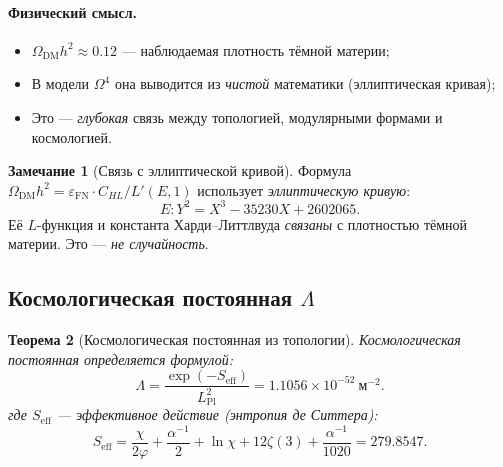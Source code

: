 \documentclass[11pt,a4paper]{article}
\newcommand{\Om}{\Omega^4}
\newcommand{\epsFN}{\varepsilon_{\text{FN}}}
\newtheorem{theorem}{Теорема}[section]
\theoremstyle{definition}
\newtheorem{remark}[theorem]{Замечание}
\begin{document}
\paragraph{Физический смысл.}
\begin{itemize}
    \item $\Omega_{\text{DM}} h^2 \approx 0.12$ — 
          наблюдаемая плотность тёмной материи;
    \item В модели $\Om$ она выводится из \emph{чистой} 
          математики (эллиптическая кривая);
    \item Это — \emph{глубокая} связь между топологией, 
          модулярными формами и космологией.
\end{itemize}

\begin{remark}[Связь с эллиптической кривой]
\label{rem:ec-dm}
Формула 
$\Omega_{\text{DM}} h^2 = \epsFN \cdot C_{HL} / L'(E, 1)$ 
использует \emph{эллиптическую кривую}:
\begin{equation}
    E: Y^2 = X^3 - 35230 X + 2602065.
\end{equation}
Её $L$-функция и константа Харди--Литтлвуда \emph{связаны} 
с плотностью тёмной материи. Это — \emph{не случайность}.
\end{remark}

\subsection{Космологическая постоянная $\Lambda$}
\label{subsec:lambda-cosmo}

\begin{theorem}[Космологическая постоянная из топологии]
\label{thm:lambda-cosmo}
Космологическая постоянная определяется формулой:
\begin{equation}
    \boxed{
    \Lambda = \frac{\exp(-S_{\text{eff}})}{L_{\text{Pl}}^2}
    = 1.1056 \times 10^{-52}~\text{м}^{-2}.
    }
    \label{eq:lambda-main}
\end{equation}
где $S_{\text{eff}}$ — эффективное действие (энтропия 
де Ситтера):
\begin{equation}
    S_{\text{eff}} = \frac{\chi}{2\varphi} + \frac{\alpha^{-1}}{2} 
    + \ln \chi + 12 \zeta(3) + \frac{\alpha^{-1}}{1020}
    = 279.8547.
\end{equation}
\end{theorem}
\end{document}
